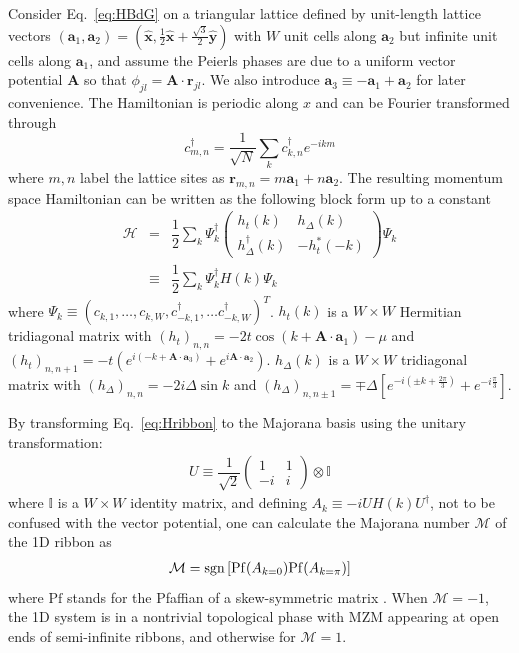 \documentclass[aps,prb,showpacs,amsmath,twocolumn,amssymb,superscriptaddress]{revtex4-2}
\let\oldhat\hat
\renewcommand{\hat}[1]{\oldhat{\mathbf{#1}}}
\newcommand{\ham}{\mathcal{H}}
\newcommand{\cc}{c^{\dagger}}
\newcommand{\de}{\Delta}
\begin{document}
Consider Eq.~\eqref{eq:HBdG} on a triangular lattice defined by unit-length lattice vectors $(\bm a_1, \bm a_2) = (\hat{x}, \frac{1}{2}\hat{x} + \frac{\sqrt{3}}{2}\hat{y})$ with $W$ unit cells along $\bm a_2$ but infinite unit cells along $\bm a_1$, and assume the Peierls phases are due to a uniform vector potential $\bm A$ so that $\phi_{jl} = \bm A\cdot \bm r_{jl}$. We also introduce $\bm a_3 \equiv -\bm a_1 + \bm a_2$ for later convenience. The Hamiltonian is periodic along $x$ and can be Fourier transformed through
\begin{equation}
  \cc_{m,n} = \dfrac{1}{\sqrt{N}} \sum_{k} \cc_{k,n} e^{-i km}
\end{equation}
where $m,n$ label the lattice sites as $\bm r_{m,n} = m\bm a_1 + n \bm a_2$. The resulting momentum space Hamiltonian can be written as the following block form up to a constant
\begin{eqnarray}\label{eq:Hribbon}
      \ham &=& \dfrac{1}{2} \sum_k \Psi_k^\dagger \left(
    \begin{matrix}
      h_t(k) & h_\Delta(k) \\
      h_\Delta^\dagger(k) & -h_t^*(-k)
    \end{matrix} \right)
    \Psi_k \\\nonumber
&\equiv&\dfrac{1}{2} \sum_k \Psi_k^\dagger H(k)
    \Psi_k 
\end{eqnarray}
where $\Psi_k \equiv (c_{k,1},\dots, c_{k,W},c^\dag_{-k,1},\dots c_{-k,W}^\dag)^T$. $h_t(k)$ is a $W\times W$ Hermitian tridiagonal matrix with $(h_t)_{n,n} = -2t\cos(k+\bm A\cdot \bm a_1) - \mu$ and $(h_t)_{n,n+1} = -t\left( e^{i(-k+\bm A\cdot \bm a_3)}  + e^{i\bm A \cdot \bm a_2}\right)$. $h_\Delta(k)$ is a $W\times W$ tridiagonal matrix with $(h_\Delta)_{n,n} = -2i\de \sin k $ and $(h_\Delta)_{n,n\pm 1} = \mp \de\left[ e^{-i(\pm k + \frac{2\pi}{3})} + e^{-i\frac{\pi}{3}} \right]$.

By transforming Eq.~\ref{eq:Hribbon} to the Majorana basis using the unitary transformation:
\begin{eqnarray}
    U\equiv \dfrac{1}{\sqrt{2}} \left(
  \begin{matrix}
    1 & 1 \\
    -i & i
  \end{matrix} \right) \otimes \mathbb{I}
\end{eqnarray}
where $\mathbb{I}$ is a ${W\times W}$ identity matrix, and defining $A_k\equiv -iU H(k) U^\dag$, not to be confused with the vector potential, one can calculate the Majorana number \cite{kitaevUnpairedMajoranaFermions2001} $\mathcal{M}$ of the 1D ribbon as \cite{liTopologicalSuperconductivityInduced2014}
\begin{eqnarray}
\mathcal{M} = {\rm sgn}\left[{{\rm Pf}(A_{k=0}) {\rm Pf}(A_{k=\pi})}\right]
\end{eqnarray}
where $\text{Pf}$ stands for the Pfaffian of a skew-symmetric matrix \cite{kitaevUnpairedMajoranaFermions2001}. When $\mathcal{M} = -1$, the 1D system is in a nontrivial topological phase with MZM appearing at open ends of semi-infinite ribbons, and otherwise for $\mathcal{M} = 1$. 
\end{document}
